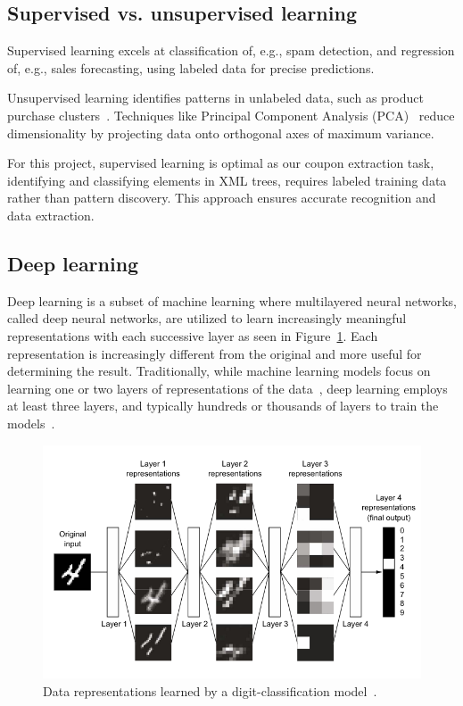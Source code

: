 \documentclass[licencjacka,en]{pracamgr}
\begin{document}
\subsection{Supervised vs. unsupervised learning}
Supervised learning excels at classification of, e.g., spam detection, and regression of, e.g., sales forecasting, using labeled data for precise predictions.

Unsupervised learning identifies patterns in unlabeled data, such as product purchase clusters~\cite{supervised_ibm}. Techniques like Principal Component Analysis (PCA)~\cite{PCA} reduce dimensionality by projecting data onto orthogonal axes of maximum variance.

For this project, supervised learning is optimal as our coupon extraction task, identifying and classifying elements in XML trees, requires labeled training data rather than pattern discovery. This approach ensures accurate recognition and data extraction.

\subsection{Deep learning}
Deep learning is a subset of machine learning where multilayered neural networks, called deep neural networks, are utilized to learn increasingly meaningful representations with each successive layer as seen in Figure~\ref{fig:nn_simple}. Each representation is increasingly different from the original and more useful for determining the result. Traditionally, while machine learning models focus on learning one or two layers of representations of the data~\cite{francuz_8}, deep learning employs at least three layers, and typically hundreds or thousands of layers to train the models~\cite{ibm_dl}.

\begin{figure}
    \centering
    \includegraphics[width=0.5\linewidth]{bachelor_images/nn_simple.png}
    \caption{Data representations learned by a digit-classification model~\cite{francuz_8}.}
    \label{fig:nn_simple}
\end{figure}
\end{document}
